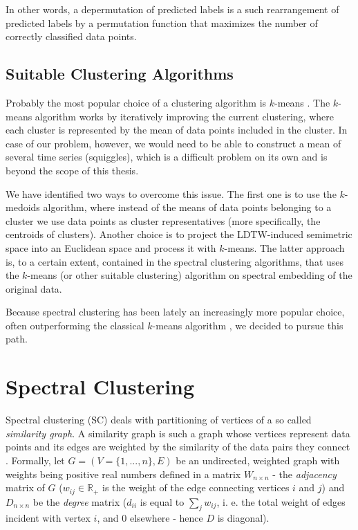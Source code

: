 In other words, a depermutation of predicted labels is a such rearrangement of predicted labels by a permutation function that maximizes the number of correctly classified data points. 

\subsection{Suitable Clustering Algorithms}
\label{sec:suitable_clustering_algorithms}
Probably the most popular choice of a clustering algorithm is $k$-means \cite{harmanVSA}. The $k$-means algorithm works by iteratively improving the current clustering, where each cluster is represented by the mean of data points included in the cluster. In case of our problem, however, we would need to be able to construct a mean of several time series (squiggles), which is a difficult problem on its own and is beyond the scope of this thesis.

We have identified two ways to overcome this issue. The first one is to use the $k$-medoids algorithm, where instead of the means of data points belonging to a cluster we use data points as cluster representatives (more specifically, the centroids of clusters). Another choice is to project the LDTW-induced semimetric space into an Euclidean space and process it with $k$-means. The latter approach is, to a certain extent, contained in the spectral clustering algorithms, that uses the $k$-means (or other suitable clustering) algorithm on spectral embedding of the original data.

Because spectral clustering has been lately an increasingly more popular choice, often outperforming the classical $k$-means algorithm \cite{von2007tutorial}, we decided to pursue this path.

\section{Spectral Clustering}
\label{sec:spectral_clustering}
Spectral clustering (SC) deals with partitioning of vertices of a so called \textit{similarity graph}. A similarity graph is such a graph whose vertices represent data points and its edges are weighted by the similarity of the data pairs they connect \cite{von2007tutorial}.
Formally, let $G=(V = \{1,...,n\}, E)$ be an undirected, weighted graph with weights being positive real numbers defined in a matrix $W_{n \times n}$ - the \textit{adjacency} matrix of $G$ ($w_{ij} \in \mathbb{R}_{+}$ is the weight of the edge connecting vertices $i$ and $j$) and $D_{n \times n}$ be the \textit{degree} matrix ($d_{ii}$ is equal to $\sum_j w_{ij}$, i. e. the total weight of edges incident with vertex $i$, and $0$ elsewhere - hence $D$ is diagonal).

